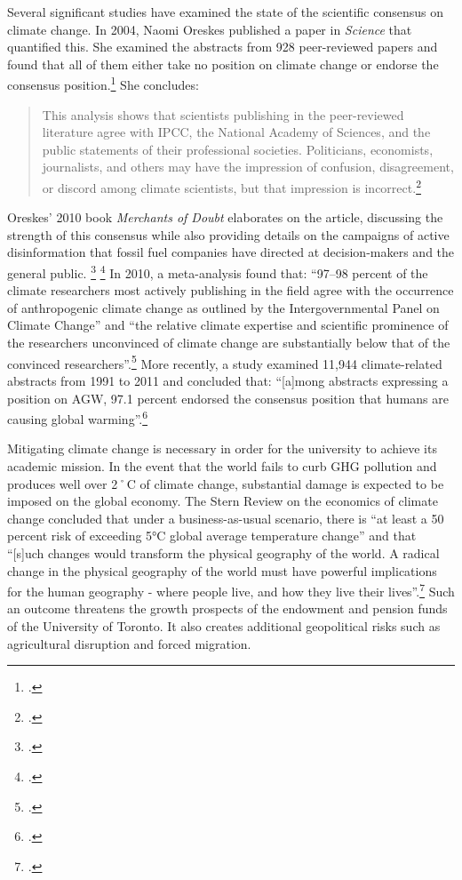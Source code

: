 \documentclass[10pt]{article}
\begin{document}
Several significant studies have examined the state of the scientific consensus on climate change.
In 2004, Naomi Oreskes published a paper in \emph{Science} that quantified this.
She examined the abstracts from 928 peer-reviewed papers and found that all of them either take no position on climate change or endorse the consensus position.\footcite[][p. 1686]{Oreskes2004}
She concludes:
\begin{quote}
This analysis shows that scientists publishing in the peer-reviewed literature agree with IPCC, the National Academy of Sciences, and the public statements of their professional societies. Politicians, economists, journalists, and others may have the impression of confusion, disagreement, or discord among climate scientists, but that impression is incorrect.\footcite[][p. 1686]{Oreskes2004}
\end{quote}
Oreskes' 2010 book \emph{Merchants of Doubt} elaborates on the article, discussing the strength of this consensus while also providing details on the campaigns of active disinformation that fossil fuel companies have directed at decision-makers and the general public. \footcite[][]{MerchantsDoubt} \footcite[See also: ][]{ClimateCoverUp}
In 2010, a meta-analysis found that: ``97–98 percent of the climate researchers most actively publishing in the field agree with the occurrence of anthropogenic climate change as outlined by the Intergovernmental Panel on Climate Change'' and ``the relative climate expertise and scientific prominence of the researchers unconvinced of climate change are substantially below that of the convinced researchers''.\footcite[][p. 1]{ExpertCredibility}
More recently, a study examined 11,944 climate-related abstracts from 1991 to 2011 and concluded that: ``[a]mong abstracts expressing a position on AGW, 97.1 percent endorsed the consensus position that humans are causing global warming''.\footcite[][]{QuantConsensus}



Mitigating climate change is necessary in order for the university to achieve its academic mission. 
In the event that the world fails to curb GHG pollution and produces well over 2˚C of climate change, substantial damage is expected to be imposed on the global economy.
The Stern Review on the economics of climate change concluded that under a business-as-usual scenario, there is ``at least a 50 percent risk of exceeding 5°C global average temperature change'' and that ``[s]uch changes would transform the physical geography of the world. A radical change in the physical geography of the world must have powerful implications for the human geography - where people live, and how they live their lives''.\footcite[][See long executive summary at: \url{http://www.hm-treasury.gov.uk/d/Executive_Summary.pdf}]{Stern2007}
Such an outcome threatens the growth prospects of the endowment and pension funds of the University of Toronto. 
It also creates additional geopolitical risks such as agricultural disruption and forced migration.
\end{document}
